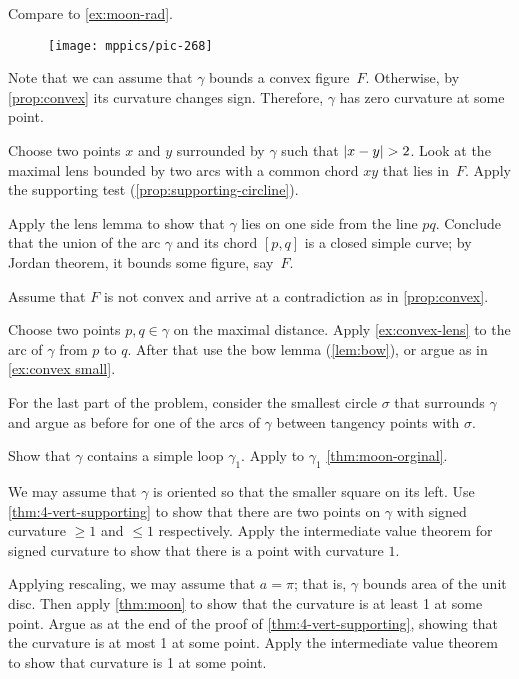 \begin{multicols}{2}
 Compare to \ref{ex:moon-rad}.

\begin{wrapfigure}{r}{34 mm}
\vskip-6mm
\centering
\texttt{[image: mppics/pic-268]}
\vskip0mm
\end{wrapfigure}

Note that we can assume that $\gamma$ bounds a convex figure~$F$.
Otherwise, by \ref{prop:convex} its curvature changes sign.
Therefore, $\gamma$ has zero curvature at some point.

Choose two points $x$ and $y$ surrounded by $\gamma$ such that $|x\z-y|\z>2$.
Look at the maximal lens bounded by two arcs with a common chord $xy$ that lies in~$F$.
Apply the supporting test (\ref{prop:supporting-circline}).

Apply the lens lemma to show that $\gamma$ lies on one side from the line $pq$.
Conclude that the union of the arc $\gamma$ and its chord $[p,q]$ is a closed simple curve;
by Jordan theorem, it bounds some figure, say~$F$.

Assume that $F$ is not convex and arrive at a contradiction as in \ref{prop:convex}. 

Choose two points $p,q\in\gamma$ on the maximal distance.
Apply \ref{ex:convex-lens} to the arc of $\gamma$ from $p$ to $q$.
After that use the bow lemma (\ref{lem:bow}), or argue as in \ref{ex:convex small}.

For the last part of the problem, consider the smallest circle $\sigma$ that surrounds $\gamma$ and argue as before for one of the arcs of $\gamma$ between tangency points with $\sigma$.

Show that $\gamma$ contains a simple loop $\gamma_1$.
Apply to $\gamma_1$ \ref{thm:moon-orginal}.

We may assume that $\gamma$ is oriented so that the smaller square on its left.
Use \ref{thm:4-vert-supporting} to show that there are two points on $\gamma$ with signed curvature $\ge 1$ and $\le 1$ respectively.
Apply the intermediate value theorem for signed curvature to show that there is a point with curvature $1$.



Applying rescaling, we may assume that $a=\pi$; that is, $\gamma$ bounds area of the unit disc.
Then apply \ref{thm:moon} to show that the curvature is at least 1 at some point.
Argue as at the end of the proof of \ref{thm:4-vert-supporting}, showing that the curvature is at most 1 at some point.
Apply the intermediate value theorem to show that curvature is  1 at some point.


\end{multicols}
